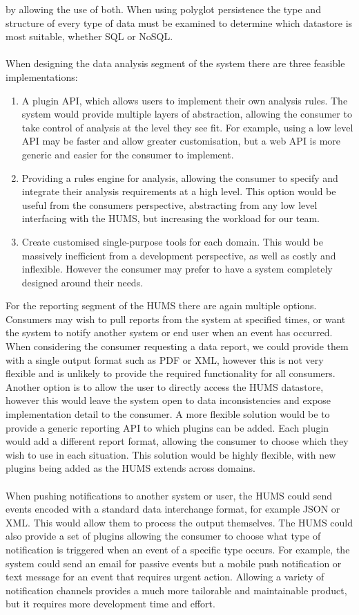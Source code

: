 \documentclass[10pt,a4paper]{article}
\begin{document}
by allowing the use of both. When using polyglot persistence the type and
structure of every type of data must be examined to determine which datastore is
most suitable, whether SQL or NoSQL.
\\ \\
When designing the data analysis segment of the system there are three feasible
implementations:
\begin{enumerate}
\item A plugin API, which allows users to implement their own analysis rules.
The system would provide multiple layers of abstraction, allowing the consumer
to take control of analysis at the level they see fit. For example, using a low
level API may be faster and allow greater customisation, but a web API is more
generic and easier for the consumer to implement.
\item Providing a rules engine for analysis, allowing the consumer to specify
and integrate their analysis requirements at a high level. This option would be
useful from the consumers perspective, abstracting from any low level
interfacing with the HUMS, but increasing the workload for our team.
\item Create customised single-purpose tools for each domain. This would be
massively inefficient from a development perspective, as well as costly and
inflexible. However the consumer may prefer to have a system completely designed
around their needs. \\
\end{enumerate}
For the reporting segment of the HUMS there are again multiple options.
Consumers may wish to pull reports from the system at specified times, or want
the system to notify another system or end user when an event has occurred. When
considering the consumer requesting a data report, we could provide them with a
single output format such as PDF or XML, however this is not very flexible and
is unlikely to provide the required functionality for all consumers. Another
option is to allow the user to directly access the HUMS datastore, however this
would leave the system open to data inconsistencies and expose implementation
detail to the consumer. A more flexible solution would be to provide a generic
reporting API to which plugins can be added. Each plugin would add a different
report format, allowing the consumer to choose which they wish to use in each
situation. This solution would be highly flexible, with new plugins being added
as the HUMS extends across domains.
\\ \\
When pushing notifications to another system or user, the HUMS could send events
encoded with a standard data interchange format, for example JSON or XML. This
would allow them to process the output themselves. The HUMS could also provide a
set of plugins allowing the consumer to choose what type of notification is
triggered when an event of a specific type occurs. For example, the system could
send an email for passive events but a mobile push notification or text message
for an event that requires urgent action. Allowing a variety of notification
channels provides a much more tailorable and maintainable product, but it
requires more development time and effort.
\end{document}
